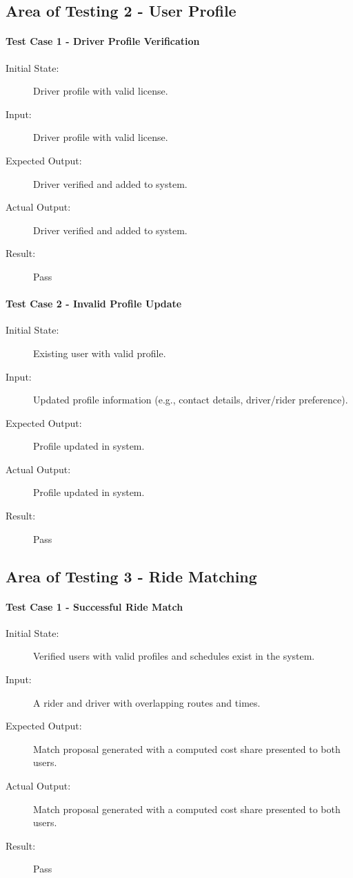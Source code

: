 \subsection{Area of Testing 2 - User Profile}
\paragraph{Test Case 1 - Driver Profile Verification} \label{test-FR2-1}
\begin{description}
    \item[Initial State:] Driver profile with valid license.
    \item[Input:] Driver profile with valid license.
    \item[Expected Output:] Driver verified and added to system.
    \item[Actual Output:] Driver verified and added to system. 
    \item[Result:] Pass
\end{description}
\paragraph{Test Case 2 - Invalid Profile Update} \label{test-FR2-2}
\begin{description}
    \item[Initial State:] Existing user with valid profile.
    \item[Input:] Updated profile information (e.g., contact details, driver/rider preference).
    \item[Expected Output:] Profile updated in system.
    \item[Actual Output:] Profile updated in system.
    \item[Result:] Pass
\end{description}


\subsection{Area of Testing 3 - Ride Matching}
\paragraph{Test Case 1 - Successful Ride Match} \label{test-FR3-1}
\begin{description}
    \item[Initial State:] Verified users with valid profiles and schedules exist in the system. 
    \item[Input:] A rider and driver with overlapping routes and times.
    \item[Expected Output:] Match proposal generated with a computed cost share presented to both users.
    \item[Actual Output:] Match proposal generated with a computed cost share presented to both users.
    \item[Result:] Pass
\end{description}

